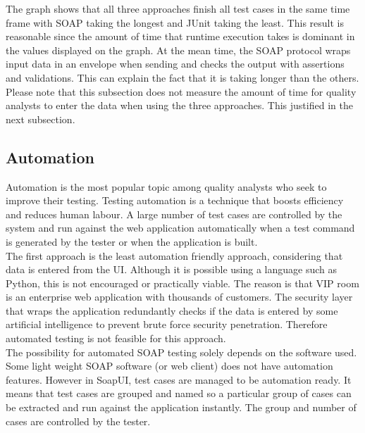 \documentclass[12pt]{article}
\begin{document}
The graph shows that all three approaches finish all test cases in the same time frame with SOAP taking the longest and JUnit taking the least. This result is reasonable since the amount of time that runtime execution takes is dominant in the values displayed on the graph. At the mean time, the SOAP protocol wraps input data in an envelope when sending and checks the output with assertions and validations. This can explain the fact that it is taking longer than the others. Please note that this subsection does not measure the amount of time for quality analysts to enter the data when using the three approaches. This justified in the next subsection. \\


\subsection{Automation}
Automation is the most popular topic among quality analysts who seek to improve their testing. Testing automation is a technique that boosts efficiency and reduces human labour. A large number of test cases are controlled by the system and run against the web application automatically when a test command is generated by the tester or when the application is built.\\

The first approach is the least automation friendly approach, considering that data is entered from the UI. Although it is possible using a language such as Python, this is not encouraged or practically viable. The reason is that VIP room is an enterprise web application with thousands of customers. The security layer that wraps the application redundantly checks if the data is entered by some artificial intelligence to prevent brute force security penetration. Therefore automated testing is not feasible for this approach.\\

The possibility for automated SOAP testing solely depends on the software used. Some light weight SOAP software (or web client) does not have automation features. However in SoapUI, test cases are managed to be automation ready. It means that test cases are grouped and named so a particular group of cases can be extracted and run against the application instantly. The group and number of cases are controlled by the tester.
\end{document}
